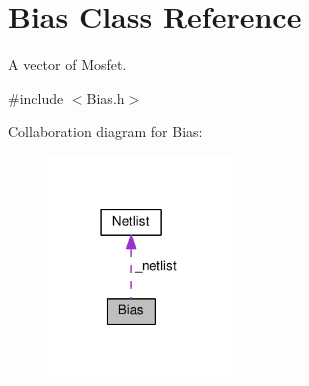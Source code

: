 \hypertarget{classBias}{}\section{Bias Class Reference}
\label{classBias}


A vector of Mosfet.  




{\ttfamily \#include $<$Bias.\+h$>$}



Collaboration diagram for Bias\+:\nopagebreak
\begin{figure}[H]
\begin{center}
\leavevmode
\includegraphics[width=138pt]{classBias__coll__graph}
\end{center}
\end{figure}
